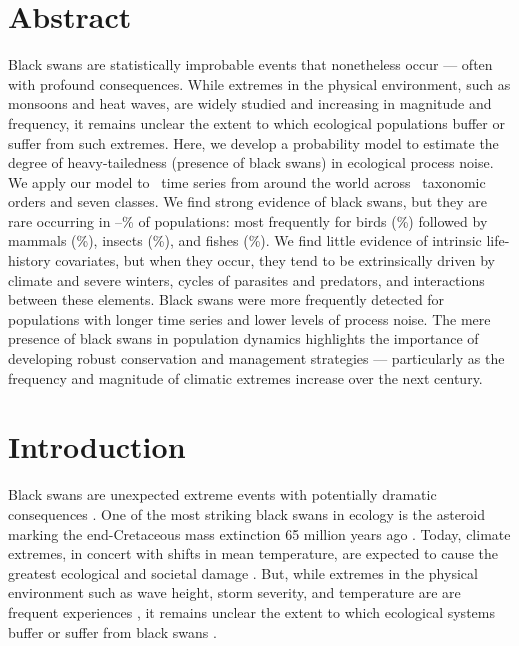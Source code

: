 

\section{Abstract}

Black swans are statistically improbable events that nonetheless occur ---
often with profound consequences. While extremes in the physical environment,
such as monsoons and heat waves, are widely studied and increasing in magnitude
and frequency, it remains unclear the extent to which ecological populations
buffer or suffer from such extremes. Here, we develop a probability model to
estimate the degree of heavy-tailedness (presence of black swans) in ecological
process noise. We apply our model to \NPops~time series from around the world
across \NOrders~taxonomic orders and seven classes. We find strong evidence of
black swans, but they are rare occurring in
\overallMinPerc--\overallMaxPerc\% of populations: most frequently for birds
(\AvesRangePerc\%) followed by mammals (\MammaliaRangePerc\%), insects
(\InsectaRangePerc\%), and fishes (\OsteichthyesRangePerc\%). We find little
evidence of intrinsic life-history covariates, but when they occur, they tend
to be extrinsically driven by climate and severe winters, cycles of parasites
and predators, and interactions between these elements. Black swans were more
frequently detected for populations with longer time series and lower levels of
process noise. The mere presence of black swans in population dynamics
highlights the importance of developing robust conservation and management
strategies --- particularly as the frequency and magnitude of climatic extremes
increase over the next century.

\section{Introduction}

Black swans are unexpected extreme events with potentially dramatic
consequences \citep{taleb2007,sornette2009}. One of the most striking black
swans in ecology is the asteroid marking the end-Cretaceous mass extinction 65 million
years ago \citep{alvarez1980,harnik2012}. Today, climate extremes, in concert with
shifts in mean temperature, are expected to cause the greatest ecological and
societal damage \citep{ipcc2012}. But, while extremes in the physical
environment such as wave height, storm severity, and temperature are are
frequent experiences \citep{gaines1993,katz2005}, it remains unclear the extent
to which ecological systems buffer or suffer from black swans
\citep{nunez2012}.

